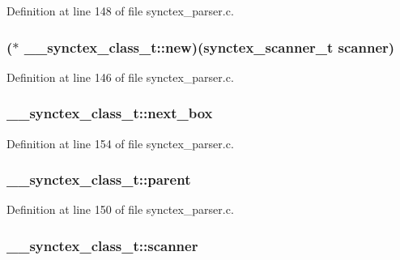 Definition at line 148 of file synctex\+\_\+parser.\+c.

\hypertarget{struct____synctex__class__t_ab4c75f21dbfd5421534d42feeab86a0f}{
\subsubsection[{new}]{($\ast$ \+\_\+\+\_\+synctex\+\_\+class\+\_\+t\+::new)({\bf synctex\+\_\+scanner\+\_\+t} {\bf scanner})}}\label{struct____synctex__class__t_ab4c75f21dbfd5421534d42feeab86a0f}


Definition at line 146 of file synctex\+\_\+parser.\+c.

\hypertarget{struct____synctex__class__t_a3ed475c3857e39e0d041f05ecd3bc6c5}{
\subsubsection[{next\+\_\+box}]{ \+\_\+\+\_\+synctex\+\_\+class\+\_\+t\+::next\+\_\+box}}\label{struct____synctex__class__t_a3ed475c3857e39e0d041f05ecd3bc6c5}


Definition at line 154 of file synctex\+\_\+parser.\+c.

\hypertarget{struct____synctex__class__t_af0db912f330c3b398c7e95eb2576ba4f}{
\subsubsection[{parent}]{ \+\_\+\+\_\+synctex\+\_\+class\+\_\+t\+::parent}}\label{struct____synctex__class__t_af0db912f330c3b398c7e95eb2576ba4f}


Definition at line 150 of file synctex\+\_\+parser.\+c.

\hypertarget{struct____synctex__class__t_ae7c5f8184868bbf7221bc3f381a92ac6}{
\subsubsection[{scanner}]{ \+\_\+\+\_\+synctex\+\_\+class\+\_\+t\+::scanner}}\label{struct____synctex__class__t_ae7c5f8184868bbf7221bc3f381a92ac6}


